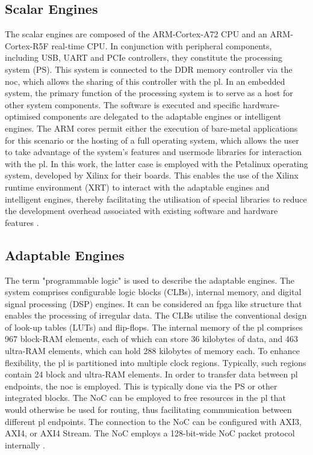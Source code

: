 \subsection{Scalar Engines}
The scalar engines are composed of the ARM-Cortex-A72 CPU and an ARM-Cortex-R5F real-time CPU. In 
conjunction with peripheral components, including USB, UART and PCIe controllers, they constitute the 
processing system (PS). This system is connected to the DDR memory controller via the \ac{noc}, which allows 
the sharing of this controller with the \ac{pl}. In an embedded system, the primary 
function of the processing system is to serve as a host for other system components. The software is 
executed and specific hardware-optimised components are delegated to the adaptable engines or 
intelligent engines. The ARM cores permit either the execution of bare-metal applications for this 
scenario or the hosting of a full operating system, which allows the user to take advantage of the 
system's features and usermode libraries for interaction with the \ac{pl}. In this work, the 
latter case is employed with the Petalinux operating system, developed by Xilinx for their boards. This 
enables the use of the Xilinx runtime environment (XRT) to interact with the adaptable engines and 
intelligent engines, thereby facilitating the utilisation of special libraries to reduce the 
development overhead associated with existing software and hardware features \cite{AMD_a_aie}.

\subsection{Adaptable Engines}
The term "programmable logic" is used to describe the adaptable engines. The system comprises 
configurable logic blocks (CLBs), internal memory, and digital signal processing (DSP) engines. It can 
be considered an \ac{fpga} like structure that enables the processing of irregular data. The CLBs utilise 
the conventional design of look-up tables (LUTs) and flip-flops. The internal memory of the \ac{pl} 
comprises 967 block-RAM elements, each of which can store 36 kilobytes of data, and 463 ultra-RAM 
elements, which can hold 288 kilobytes of memory each. To enhance flexibility, the \ac{pl} is partitioned 
into multiple clock regions. Typically, such regions contain 24 block and ultra-RAM elements. In order 
to transfer data between \ac{pl} endpoints, the \ac{noc} is employed. This is typically done via the PS or other 
integrated blocks. The NoC can be employed to free resources in the \ac{pl} that would otherwise be used for 
routing, thus facilitating communication between different \ac{pl} endpoints. The connection to the NoC can 
be configured with AXI3, AXI4, or AXI4 Stream. The NoC employs a 128-bit-wide NoC packet protocol 
internally \cite{AMD_a_aie}.\par

